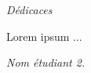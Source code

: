 \begin{center}
\Huge{\emph{Dédicaces}}
\end{center}

\vspace{1cm}

Lorem ipsum ...

\vspace{3cm}
\begin{flushright}
	\textit{Nom étudiant 2.}
\end{flushright}